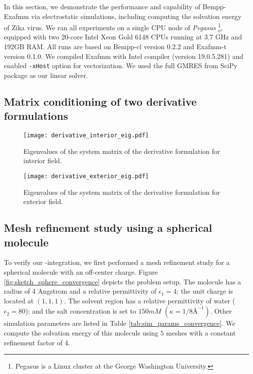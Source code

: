 In this section, we demonstrate the performance and capability of Bempp-Exafmm via electrostatic simulations, including computing the solvation energy of Zika virus.
We ran all experiments on a single CPU node of \textit{Pegasus} \footnote{Pegasus is a Linux cluster at the George Washington University.}, equipped with two 20-core Intel Xeon Gold 6148 CPUs running at 3.7 GHz and 192GB RAM.
All runs are based on Bempp-cl version 0.2.2 and Exafmm-t version 0.1.0.
We compiled Exafmm with Intel compiler (version 19.0.5.281) and enabled \texttt{-xHost} option for vectorization.
We used the full GMRES from SciPy package as our linear solver.

\subsection{Matrix conditioning of two derivative formulations}

\begin{figure}[htbp]
    \centering
    \texttt{[image: derivative\_interior\_eig.pdf]}
    \caption{Eigenvalues of the system matrix of the derivative formulation for interior field.}
    \label{fig:derivative_interior_eig}
\end{figure}

\begin{figure}[htbp]
    \centering
    \texttt{[image: derivative\_exterior\_eig.pdf]}
    \caption{Eigenvalues of the system matrix of the derivative formulation for exterior field.}
    \label{fig:derivative_exterior_eig}
\end{figure}

\subsection{Mesh refinement study using a spherical molecule}

To verify our \bem-\fmm integration, we first performed a mesh refinement study for a spherical molecule with an off-center charge.
Figure \ref{fig:sketch_sphere_convergence} depicts the problem setup.
The molecule has a radius of 4 Angstrom and a relative permittivity of $\epsilon_1 = 4$; the unit charge is located at $(1,1,1)$.
The solvent region has a relative permittivity of water ($\epsilon_2 = 80$); and the salt concentration is set to $150mM$ $(\kappa = 1/8 {\si{\angstrom}}^{-1})$.
Other simulation parameters are listed in Table \ref{tab:sim_params_convergence}.
We compute the solvation energy of this molecule using $5$ meshes with a constant refinement factor of 4.

